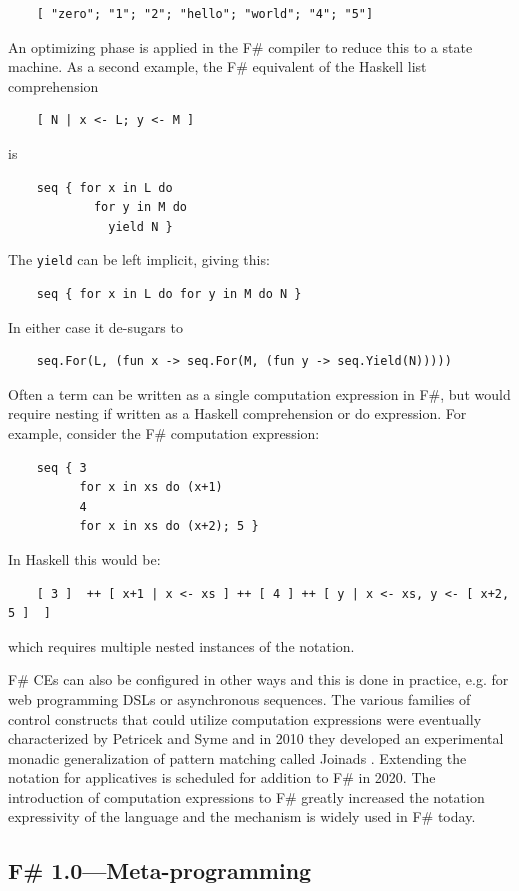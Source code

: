 \documentclass[acmsmall,screen]{acmart}
\begin{document}
\begin{verbatim}
    [ "zero"; "1"; "2"; "hello"; "world"; "4"; "5"] 
\end{verbatim}
An optimizing phase is applied in the F\# compiler to reduce this to a state machine.
As a second example, the F\# equivalent of the Haskell list comprehension
\begin{verbatim}
    [ N | x <- L; y <- M ]  
\end{verbatim}
is
\begin{verbatim}
    seq { for x in L do 
            for y in M do 
              yield N }
\end{verbatim}
The \texttt{yield} can be left implicit, giving this:
\begin{verbatim}
    seq { for x in L do for y in M do N }
\end{verbatim}
In either case it de-sugars to
\begin{verbatim}
    seq.For(L, (fun x -> seq.For(M, (fun y -> seq.Yield(N)))))
\end{verbatim}
Often a term can be written as a single computation expression in F\#, but would require nesting if written as a Haskell comprehension or do expression. For example, 
consider the F\# computation expression:
\begin{verbatim}
    seq { 3
          for x in xs do (x+1)
          4 
          for x in xs do (x+2); 5 }
\end{verbatim}
In Haskell this would be:
\begin{verbatim}
    [ 3 ]  ++ [ x+1 | x <- xs ] ++ [ 4 ] ++ [ y | x <- xs, y <- [ x+2, 5 ]  ]
\end{verbatim}
which requires multiple nested instances of the notation.

F\# CEs can also be configured in other ways and this is done in practice, e.g. for web programming DSLs or asynchronous sequences.
The various families of control constructs that could utilize computation expressions were eventually characterized by Petricek
and Syme \citep{Petricek2014} and in 2010 they developed an experimental monadic generalization of pattern matching called Joinads \citep{Petricek2011}.
Extending the notation for applicatives \citep{applicative} is scheduled for addition to F\# in 2020. The introduction of computation expressions to F\# greatly increased the notation expressivity of the language
and the mechanism is widely used in F\# today.

\subsection*{F\# 1.0---Meta-programming}
\end{document}
